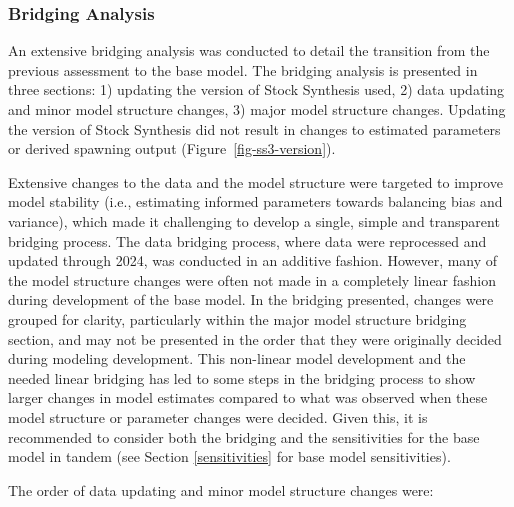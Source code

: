 \documentclass[
  english,
]{article}
\begin{document}
\subsubsection{Bridging Analysis}\label{bridging}

An extensive bridging analysis was conducted to detail the transition
from the previous assessment to the base model. The bridging analysis is
presented in three sections: 1) updating the version of Stock Synthesis
used, 2) data updating and minor model structure changes, 3) major model
structure changes. Updating the version of Stock Synthesis did not
result in changes to estimated parameters or derived spawning output
(Figure~\ref{fig-ss3-version}).

Extensive changes to the data and the model structure were targeted to
improve model stability (i.e., estimating informed parameters towards
balancing bias and variance), which made it challenging to develop a
single, simple and transparent bridging process. The data bridging
process, where data were reprocessed and updated through 2024, was
conducted in an additive fashion. However, many of the model structure
changes were often not made in a completely linear fashion during
development of the base model. In the bridging presented, changes were
grouped for clarity, particularly within the major model structure
bridging section, and may not be presented in the order that they were
originally decided during modeling development. This non-linear model
development and the needed linear bridging has led to some steps in the
bridging process to show larger changes in model estimates compared to
what was observed when these model structure or parameter changes were
decided. Given this, it is recommended to consider both the bridging and
the sensitivities for the base model in tandem (see Section
\ref{sensitivities} for base model sensitivities).

The order of data updating and minor model structure changes were:
\end{document}
